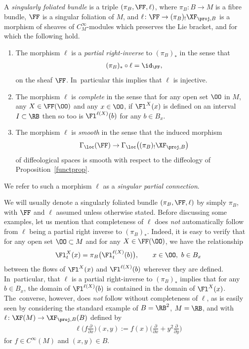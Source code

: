 \begin{Definition}\label{singfolbund}
A \textit{singularly foliated bundle} is a triple $(\pi_{B},\FF,\ell)$, where $\pi_{B}\colon B\rightarrow M$ is a fibre bundle, $\FF$ is a singular foliation of $M$, and $\ell\colon \FF\rightarrow(\pi_{B})_{!}\XF_{\proj,B}$ is a morphism of sheaves of $C^{\infty}_{M}$-modules which preserves the Lie bracket, and for which the following hold.
\begin{enumerate}\itemsep=0pt
\item The morphism $\ell$ is a \textit{partial right-inverse} to $(\pi_{B})_{*}$ in the sense that
\begin{gather*}
(\pi_{B})_{*}\circ\ell = \id_{\FF},
\end{gather*}
on the sheaf $\FF$. In~particular this implies that $\ell$ is injective.
\item The morphism $\ell$ is \textit{complete} in the sense that for any open set $\OO$ in $M$, any $X\in\FF(\OO)$ and any $x\in\OO$, if $\Fl^{X}(x)$ is defined on an interval $I\subset\RB$ then so too is $\Fl^{\ell(X)}(b)$ for any $b\in B_{x}$.
\item The morphism $\ell$ is \textit{smooth} in the sense that the induced morphism
\begin{gather*}
\Gamma_{\loc}(\FF)\rightarrow \Gamma_{\loc}\big((\pi_{B})_{!}\XF_{\proj,B}\big)
\end{gather*}
of diffeological spaces is smooth with respect to the diffeology of Proposition~\ref{functprop}.
\end{enumerate}
We refer to such a morphism $\ell$ as a \textit{singular partial connection}.
\end{Definition}

We will usually denote a singularly foliated bundle $(\pi_{B},\FF,\ell)$ by simply $\pi_{B}$, with $\FF$ and $\ell$ assumed unless otherwise stated. Before discussing some examples, let us mention that completeness of $\ell$ does \textit{not} automatically follow from $\ell$ being a partial right inverse to $(\pi_{B})_{*}$. Indeed, it is easy to verify that for any open set $\OO\subset M$ and for any $X\in\FF(\OO)$, we have the relationship
\begin{gather*}
\Fl^{X}_{t}(x) = \pi_{B}\big(\Fl^{\ell(X)}_{t}(b)\big),\qquad x\in\OO,\ b\in B_{x}
\end{gather*}
between the flows of $\Fl^{X}(x)$ and $\Fl^{\ell(X)}(b)$ wherever they are defined. In~particular, that $\ell$ is a partial right-inverse to $(\pi_{B})_{*}$ implies that for any $b\in B_{x}$, the domain of $\Fl^{\ell(X)}(b)$ is contained in the domain of $\Fl^{X}(x)$. The~converse, however, does \textit{not} follow without completeness of $\ell$, as is easily seen by considering the standard example of $B =\RB^{2}$, $M = \RB$, and with $\ell\colon \XF(M)\rightarrow\XF_{\proj,B}(B)$ defined by
\begin{gather*}
\ell\bigg(f\frac{\partial}{\partial x}\bigg)(x,y):=f(x)\bigg(\frac{\partial}{\partial x}+y^{2}\frac{\partial}{\partial y}\bigg)
\end{gather*}
for $f\in C^{\infty}(M)$ and $(x,y)\in B$.

